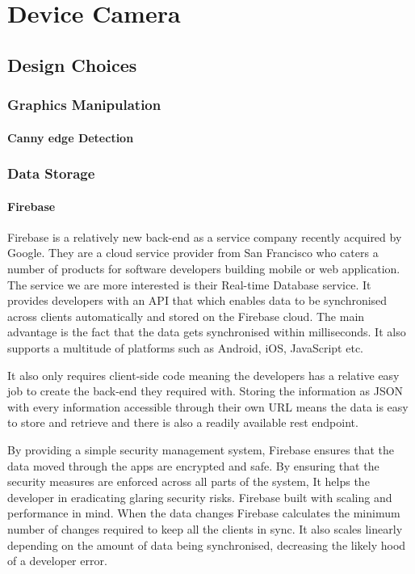 \chapter{Device Camera}

\label{ch:devcamera}
\section{Design Choices}
\subsection{Graphics Manipulation} 
\subsubsection{Canny edge Detection}


\subsection{Data Storage}
\subsubsection{Firebase}

Firebase\cite{firebase} is a relatively new back-end as a service
company recently acquired by Google. They are a cloud service provider
from San Francisco who caters a number of products for software developers
building mobile or web application. The service we are more interested
is their Real-time Database service. It provides developers with an
API that which enables data to be synchronised across clients automatically
and stored on the Firebase cloud. The main advantage is the fact that
the data gets synchronised within milliseconds. It also supports a
multitude of platforms such as Android, iOS, JavaScript etc.

It also only requires client-side code meaning the developers has
a relative easy job to create the back-end they required with. Storing
the information as JSON with every information accessible through
their own URL means the data is easy to store and retrieve and there
is also a readily available rest endpoint. 

By providing a simple security management system, Firebase ensures
that the data moved through the apps are encrypted and safe. By ensuring
that the security measures are enforced across all parts of the system,
It helps the developer in eradicating glaring security risks. Firebase
built with scaling and performance in mind. When the data changes
Firebase calculates the minimum number of changes required to keep
all the clients in sync. It also scales linearly depending on the
amount of data being synchronised, decreasing the likely hood of a
developer error. 

